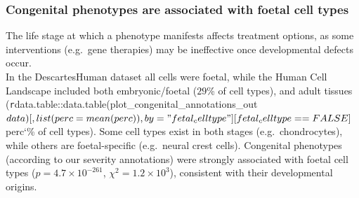 \documentclass[
]{article}
\begin{document}
\begin{figure}[H]
{}

\caption{\label{fig-celltype-severity-dot}}

\end{figure}%

\subsubsection{Congenital phenotypes are associated with foetal cell
types}\label{congenital-phenotypes-are-associated-with-foetal-cell-types}

The life stage at which a phenotype manifests affects treatment options,
as some interventions (e.g.~gene therapies) may be ineffective once
developmental defects occur.\\
In the DescartesHuman dataset all cells were foetal, while the Human
Cell Landscape included both embryonic/foetal (\(29\)\% of cell types),
and adult tissues
(\texttt{r}data.table::data.table(plot\_congenital\_annotations\_out\(data)[,list(perc=mean(perc)),by="fetal_celltype"][fetal_celltype==FALSE]\)perc`\%
of cell types). Some cell types exist in both stages
(e.g.~chondrocytes), while others are foetal-specific (e.g.~neural crest
cells). Congenital phenotypes (according to our severity annotations)
were strongly associated with foetal cell types
(\(p=\)\(4.7 \times 10^{-261}\), \(\chi^2=\)\(1.2 \times 10^{3}\)),
consistent with their developmental origins.
\end{document}
